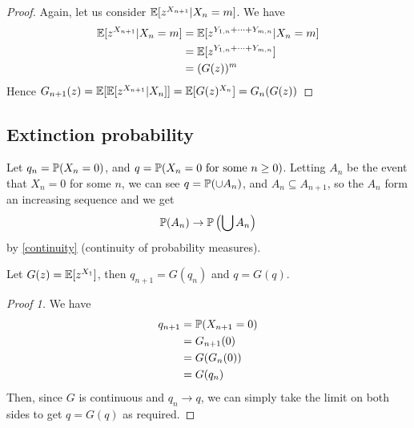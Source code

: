 \documentclass{../template/note}
\begin{document}
    \begin{proof}
        Again, let us consider \(\mathbb E[z^{X_{n+1}} | X_n = m]\). We have
        \begin{align*}
            \mathbb E[z^{X_{n+1}} | X_n = m] &= \mathbb E[z^{Y_{1, n} + \dots + Y_{m, n}} | X_n = m] \\
            &= \mathbb E[z^{Y_{1, n} + \dots + Y_{m, n}}] \\
            &= (G(z))^m
        \end{align*}
        Hence \(G_{n+1}(z) = \mathbb E[\mathbb E[z^{X_{n+1}} | X_n]] = \mathbb E[G(z)^{X_n}] = G_n(G(z))\)
    \end{proof}
    
    \subsection{Extinction probability}

    Let \(q_n = \mathbb P(X_n = 0)\), and \(q = \mathbb P(X_n = 0 \text{ for some }n \geq 0)\). Letting \(A_n\) be the event that \(X_n = 0\) for some \(n\), we can see \(q = \mathbb P(\cup A_n)\), and \(A_n \subseteq A_{n+1}\), so the \(A_n\) form an increasing sequence and we get
    \begin{align*}
        \mathbb P(A_n) \to \mathbb P\left(\bigcup A_n\right)
    \end{align*}
    by \cref{continuity} (continuity of probability measures).
    
    \begin{lemma}
        Let \(G(z) = \mathbb E[z^{X_1}]\), then \(q_{n+1} = G(q_n)\) and \(q = G(q)\).
    \end{lemma}
    
    \begin{proof}[Proof 1]
        We have
        \begin{align*}
            q_{n+1} &= \mathbb P(X_{n+1} = 0) \\
            &= G_{n+1}(0) \\
            &= G(G_n(0)) \\
            &= G(q_n)
        \end{align*}
        Then, since \(G\) is continuous and \(q_n \to q\), we can simply take the limit on both sides to get \(q=G(q)\) as required.
    \end{proof}
    
\end{document}
